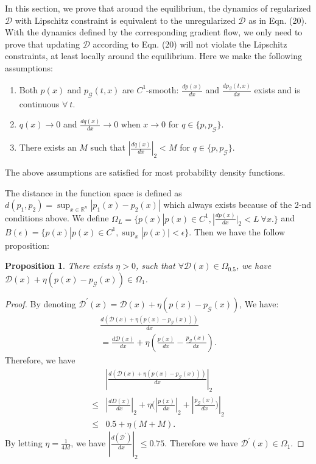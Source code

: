 \documentclass{article}
\newcommand{\xG}{\mathcal{G}}
\newcommand{\xD}{\mathcal{D}}
\newcommand{\Real}{\mathbb{R}}
\newtheorem{proposition}{Proposition}
\theoremstyle{definition}
\begin{document}
In this section, we prove that around the equilibrium, the dynamics of regularized $\xD$ with Lipschitz constraint is equivalent to the unregularized $\xD$ as in Eqn. (20). 
With the dynamics defined by the corresponding gradient flow, we only need to prove that updating $\xD$ according to Eqn. (20) will not violate the Lipschitz constraints, at least locally around the equilibrium. Here we make the following assumptions:
\begin{enumerate}
    \item Both $p(x)$ and $p_\xG(t, x)$ are $C^1$-smooth: $\frac{dp(x)}{dx}$ and $\frac{dp_\xG(t, x)}{dx}$ exists and is continuous $\forall~t$.
    \item $q(x)\to 0$ and $\frac{dq(x)}{dx}\to 0$ when $x\to 0$ for $q\in\{p, p_\xG\}$.
    \item There exists an $M$ such that $|\frac{dq(x)}{dx}|_2 < M$ for $q\in\{p, p_\xG\}$.
\end{enumerate}
The above assumptions are satisfied for most probability density functions.

The distance in the function space is defined as $d(p_1, p_2) = \sup_{x\in\Real^n} |p_1(x) - p_2(x)|$ which always exists because of the 2-nd conditions above. We define $\Omega_{L}=\{p(x)|p(x)\in C^1, |\frac{dp(x)}{dx}|_2 < L~\forall x.\}$ and $B(\epsilon)=\{p(x)|p(x)\in C^1, \sup_{x} |p(x)| < \epsilon\}$.
Then we have the follow proposition:

\begin{proposition}
There exists $\eta>0$, such that $\forall \xD(x)\in \Omega_{0.5}$, we have $\xD(x)+\eta(p(x) - p_\xG(x)) \in \Omega_{1}$. 
\end{proposition}

\begin{proof}
By denoting $\xD^\prime(x) = \xD(x)+\eta(p(x) - p_\xG(x))$, We have:
\begin{align}
    \frac{d(\xD(x)+\eta(p(x) - p_\xG(x)))}{dx} \\
    = \frac{d\xD(x)}{dx} + \eta(\frac{p(x)}{dx} - \frac{p_\xG(x)}{dx}).\nonumber
\end{align}
Therefore, we have 
\begin{align}
    &|\frac{d(\xD(x)+\eta(p(x) - p_\xG(x)))}{dx}|_2 \\
    \leq &|\frac{dD(x)}{dx}|_2 + \eta(|\frac{p(x)}{dx}|_2 + |\frac{p_\xG(x)}{dx})|_2 \\
    \leq &0.5 + \eta(M+M).
\end{align}
By letting $\eta=\frac{1}{4M}$, we have $|\frac{d(\xD^\prime)}{dx}|_2\leq 0.75$. Therefore we have $\xD^\prime(x)\in \Omega_{1}$.
\end{proof}
\end{document}

